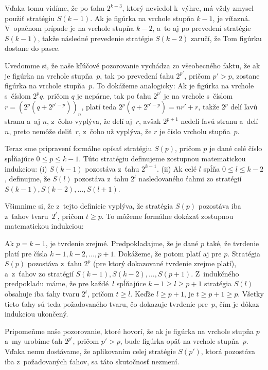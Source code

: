 {Vďaka tomu vidíme, že po ťahu $2^{k-3}$, ktorý neviedol k~výhre, má vždy
zmysel použiť stratégiu $S(k-1)$. Ak je figúrka na vrchole stupňa $k-1$,
je víťazná. V~opačnom prípade je na vrchole stupňa $k-2$, a~to
aj po prevedení stratégie $S(k-1)$, takže následné prevedenie
stratégie $S(k-2)$ zaručí, že Tom figúrku dostane do pasce.

Uvedomme si, že naše kľúčové pozorovanie vychádza zo
všeobecného faktu, že ak je figúrka na vrchole stupňa~$p$, tak po
prevedení ťahu $2^{p'}$, pričom $p'> p$, zostane figúrka na vrchole stupňa~$p$.
To dokážeme analogicky: Ak je figúrka na vrchole s~číslom $2^p q$,
pričom $q$ je nepárne, tak po ťahu $2^{p'}$ je na vrchole s~číslom
$r = (2^p (q+2^{p'-p}))_n$, platí teda $2^p(q+2^{p'-p}) = nr'+ r$,
takže $2^p$ delí ľavú stranu a~aj $n$, z~čoho vyplýva,
že delí aj~$r$, avšak $2^{p+1}$ nedelí ľavú
stranu a~delí~$n$, preto nemôže deliť~$r$, z~čoho už vyplýva, že
$r$ je číslo vrcholu stupňa~$p$.

Teraz sme pripravení formálne opísať stratégiu $S(p)$, pričom $p$ je
dané celé číslo spĺňajúce $0 \le p \le k-1$. Túto stratégiu
definujeme zostupnou matematickou indukciou:
\smallskip
\ite (i) $S(k-1)$ pozostáva z~ťahu $2^{k-1}$.
\ite (ii) Ak celé $l$ spĺňa $0 \le l \le k-2$, definujme,
že $S(l)$ pozostáva z~ťahu $2^l$ nasledovaného ťahmi zo
stratégií $S(k-1), S(k-2), \dots, S(l+1)$.
\smallskip

Všimnime si, že z~tejto definície vyplýva, že stratégia $S(p)$
pozostáva iba z~ťahov tvaru~$2^t$, pričom $t \ge p$. To môžeme
formálne dokázať zostupnou matematickou indukciou:

Ak $p = k-1$, je tvrdenie zrejmé. Predpokladajme, že je dané $p$
také, že tvrdenie platí pre čísla $k-1, k-2, \ldots, p+1$.
Dokážeme, že potom platí aj pre $p$. Stratégia $S(p)$ pozostáva
z~ťahu $2^p$ (pre ktorý dokazované tvrdenie zrejme platí), a~z~ťahov
zo stratégií $S(k-1), S(k-2), \ldots, S(p+1)$. Z~indukčného
predpokladu máme, že pre každé~$l$ spĺňajúce $k-1 \ge l \ge p+1$
stratégia $S(l)$ obsahuje iba ťahy tvaru $2^t$, pričom $t \ge l$.
Keďže $l \ge p+1$, je $t \ge p+1 \ge p$. Všetky tieto ťahy sú
teda požadovaného tvaru, čo dokazuje tvrdenie pre~$p$, čím je
dôkaz indukciou ukončený.

Pripomeňme naše pozorovanie, ktoré hovorí, že ak je
figúrka na vrchole stupňa $p$ a~my urobíme ťah $2^{p'}$, pričom $p'> p$,
bude figúrka opäť na vrchole stupňa~$p$. Vďaka nemu dostávame, že
aplikovaním celej stratégie $S(p')$, ktorá pozostáva iba
z~požadovaných ťahov, sa táto skutočnosť nezmení.

}
